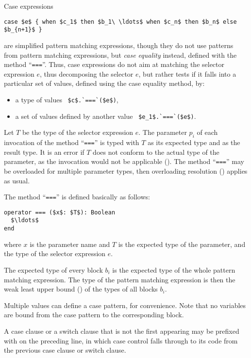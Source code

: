 Case expressions 
\begin{lstlisting}
case $e$ { when $c_1$ then $b_1\ \ldots$ when $c_n$ then $b_n$ else $b_{n+1}$ }
\end{lstlisting}
are simplified pattern matching expressions, though they do not use patterns from pattern matching expressions, but {\em case equality} instead, defined with the method ``\lstinline!===!''. Thus, case expressions do not aim at matching the selector expression $e$, thus decomposing the selector $e$, but rather tests if it falls into a particular set of values, defined using the case equality method, by:
\begin{itemize}
  \item a type of values ~\lstinline!$c$.`===`($e$)!,
  \item a set of values defined by another value ~\lstinline!$e_1$.`===`($e$)!.
\end{itemize}

Let $T$ be the type of the selector expression $e$. The parameter $p_i$ of each invocation of the method ``\lstinline!===!'' is typed with $T$ as its expected type and  as the result type. It is an error if $T$ does not conform to the actual type of the parameter, as the invocation would not be applicable (). The method ``\lstinline!===!'' may be overloaded for multiple parameter types, then overloading resolution () applies as usual. 

The method ``\lstinline!===!'' is defined basically as follows:
\begin{lstlisting}
operator === ($x$: $T$): Boolean
  $\ldots$
end
\end{lstlisting}
where $x$ is the parameter name and $T$ is the expected type of the parameter, and the type of the selector expression $e$. 

The expected type of every block $b_i$ is the expected type of the whole pattern matching expression. The type of the pattern matching expression is then the weak least upper bound () of the types of all blocks $b_i$.

Multiple values can define a case pattern, for convenience. Note that no variables are bound from the case pattern to the corresponding block.

A case clause or a switch clause that is not the first appearing may be prefixed with  on the preceding line, in which case control falls through to its code from the previous case clause or switch clause. 

